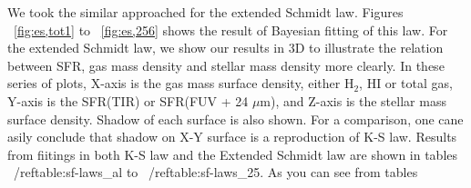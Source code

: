\documentclass[useAMS,usenatbib]{mn2e}
\begin{document}
We took the similar approached for the extended Schmidt law. Figures ~\ref{fig:es,tot1} to ~\ref{fig:es,256} shows the result of Bayesian fitting of this law. For the extended Schmidt law, we show our results in 3D to illustrate the relation between SFR, gas mass density and stellar mass density more clearly. In these series of plots, X-axis is the gas mass  surface density, either H$_2$, HI or total gas, Y-axis is the SFR(TIR) or SFR(FUV + 24 $\mu$m), and Z-axis is the stellar mass surface density. Shadow of each surface is also shown. For a comparison, one cane asily conclude that shadow on X-Y surface is a reproduction of K-S law.  Results from fiitings in both K-S law and the Extended Schmidt law are shown in tables ~/ref{table:sf-laws_al} to ~/ref{table:sf-laws_25}. As you can see from tables 






\end{document}
